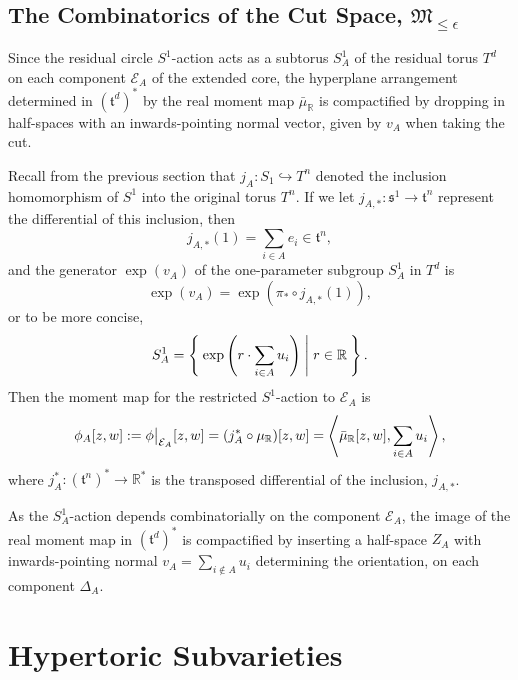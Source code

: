 \documentclass{amsart}
\newcommand{\ra}{\rightarrow}
\newcommand{\lbracket}{\left(}
\newcommand{\rbracket}{\right)}
\newcommand{\e}{\epsilon}
\newcommand{\RR}{\mathbb{R}}
\newcommand{\mcE}{\mathcal{E}}
\newcommand{\mft}{\mathfrak{t}}
\newcommand{\mc}[1]{\mathcal{#1}}
\newcommand{\mf}[1]{\mathfrak{#1}}
\newcommand{\mrr}{\mu_{\mathbb{R}}}
\newcommand\restr[2]{{%
		\left.\kern-\nulldelimiterspace %
		#1 %
		\vphantom{\big|} %
		\right|_{#2} %
}}
\begin{document}
	\subsection{The Combinatorics of the Cut Space, $\mf{M}_{\leq \e}$}
	
	Since the residual circle $S^{1}$-action acts as a subtorus $S_{A}^{1}$ of the residual torus $T^{d}$ on each component $\mc{E}_{A}$ of the extended core, the hyperplane arrangement determined in $(\mft^{d})^{\ast}$ by the real moment map $\bar{\mu}_{\RR}$ is compactified by dropping in half-spaces with an inwards-pointing normal vector, given by $v_{A}$ when taking the cut. 
	
	Recall from the previous section that $j_{A}: S_{1} \hookrightarrow T^{n}$ denoted the inclusion homomorphism of $S^{1}$ into the original torus $T^{n}$. If we let $j_{A, \ast}: \mf{s}^{1} \rightarrow \mft^{n}$ represent the differential of this inclusion, then
	\[
	j_{A,\ast}(1) = \sum_{i \in A} e_{i} \in \mft^{n},
	\]
	and the generator $\exp(v_{A})$ of the one-parameter subgroup $S_{A}^{1}$ in $T^{d}$ is
	\[
	\exp(v_{A}) = \exp\lbracket \pi_{\ast} \circ j_{A, \ast}(1) \rbracket,
	\]
	or to be more concise,
	\[
	S_{A}^{1} = \Set{ \exp \lbracket r \cdot \sum_{i \in A} u_{i} \rbracket | r \in \RR }.
	\]
	Then the moment map for the restricted $S^{1}$-action to $\mcE_{A}$ is
	\begin{equation*}
		\phi_{A}[z,w] := \restr{\phi}{\mcE_{A}} [z,w] =  (j_{A}^{\ast} \circ \mrr)[z,w] = \left\langle \bar{\mu}_{\RR}[z,w], \sum_{i\in A} u_{i} \right\rangle,
	\end{equation*}
	where $j_{A}^{\ast} : (\mft^{n})^{\ast} \ra \RR^{\ast}$ is the transposed differential of the inclusion, $j_{A, \ast}$.
	
	As the $S_{A}^{1}$-action depends combinatorially on the component $\mcE_{A}$, the image of the real moment map in $(\mft^{d})^{\ast}$ is compactified by inserting a half-space $Z_{A}$ with inwards-pointing normal $v_{A} = \sum_{i \not\in A}u_{i}$ determining the orientation, on each component $\Delta_{A}$.
	
	\section{Hypertoric Subvarieties}
	
	
	

	
	
	
	
	
	
	
	
	
	
	
	
	
	
	
	
	
	
	
	
	
	
	  
	
	
\end{document}
